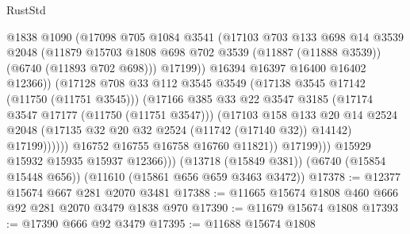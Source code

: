 \begin{lexlean}{RustStd}
\begin{coremodule}
                              @1838
                              @1090
                              (@17098
                                @705
                                @1084
                                @3541
                                (@17103
                                  @703
                                  @133
                                  @698
                                  @14
                                  @3539
                                  @2048
                                  (@11879
                                    @15703
                                    @1808
                                    @698
                                    @702
                                    @3539
                                    (@11887 (@11888 @3539))
                                    (@6740 (@11893 @702 @698)))
                                  @17199))
                              @16394
                              @16397
                              @16400
                              @16402
                              @12366))
                          (@17128
                            @708
                            @33
                            @112
                            @3545
                            @3549
                            (@17138 @3545 @17142 (@11750 (@11751 @3545)))
                            (@17166
                              @385
                              @33
                              @22
                              @3547
                              @3185
                              (@17174 @3547 @17177 (@11750 (@11751 @3547)))
                              (@17103
                                @158
                                @133
                                @20
                                @14
                                @2524
                                @2048
                                (@17135 @32 @20 @32 @2524 (@11742 (@17140 @32)) @14142)
                                @17199))))))
                    @16752
                    @16755
                    @16758
                    @16760
                    @11821))
                @17199)))
          @15929
          @15932
          @15935
          @15937
          @12366)))
    (@13718 (@15849 @381))
    (@6740 (@15854 @15448 @656))
    (@11610 (@15861 @656 @659 @3463 @3472))
@17378 := @12377 @15674 @667 @281 @2070 @3481
@17388 := @11665 @15674 @1808 @460 @666 @92 @281 @2070 @3479 @1838 @970
@17390 := @11679 @15674 @1808
@17393 := @17390 @666 @92 @3479
@17395 := @11688 @15674 @1808

\end{coremodule}
\end{lexlean}
